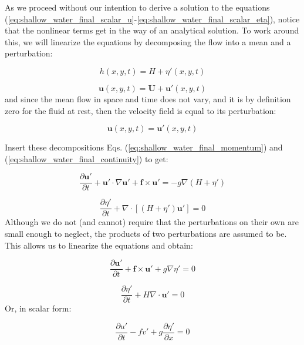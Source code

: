 \documentclass[12pt]{article}
\numberwithin{equation}{section}
\numberwithin{figure}{section}
\numberwithin{table}{section}
\begin{document}
As we proceed without our intention to derive a solution to the
equations (\ref{eq:shallow_water_final_scalar_u}-\ref{eq:shallow_water_final_scalar_eta}),
notice that the nonlinear terms get in the way of an analytical solution.
To work around this, we will linearize the equations by decomposing the flow
into a mean and a perturbation:

\begin{equation}
  h(x, y, t) = H + \eta'(x, y, t)
\end{equation}

\begin{equation}
  \mathbf{u}(x, y, t) = \mathbf{U} + \mathbf{u}'(x, y, t)
\end{equation}
and since the mean flow in space and time does not vary, and it is by definition
zero for the fluid at rest, then the velocity field is equal to its perturbation:

\begin{equation}
  \mathbf{u}(x, y, t) = \mathbf{u}'(x, y, t)
\end{equation}

Insert these decompositions Eqs. (\ref{eq:shallow_water_final_momentum})
and (\ref{eq:shallow_water_final_continuity}) to get:

\begin{equation}
  \frac{\partial \mathbf{u}'}{\partial t} + 
  \mathbf{u}' \cdot \nabla \mathbf{u}' +
  \mathbf{f} \times \mathbf{u}' =
  - g \nabla \left( H + \eta' \right)
\end{equation}

\begin{equation}
  \frac{\partial \eta'}{\partial t} + \nabla \cdot \left[ (H + \eta') \mathbf{u}' \right] = 0
\end{equation}
Although we do not (and cannot) require that the perturbations on their own
are small enough to neglect, the products of two perturbations are assumed to
be.
This allows us to linearize the equations and obtain:

\begin{equation}
  \frac{\partial \mathbf{u}'}{\partial t} + 
  \mathbf{f} \times \mathbf{u}' +
  g \nabla \eta' = 0
\end{equation}

\begin{equation}
  \frac{\partial \eta'}{\partial t} + H \nabla \cdot \mathbf{u}' = 0
\end{equation}
Or, in scalar form:

\begin{equation}
  \frac{\partial u'}{\partial t} - f v' + g \frac{\partial \eta'}{\partial x} = 0
  \label{eq:swe_linear_u}
\end{equation}
\end{document}
